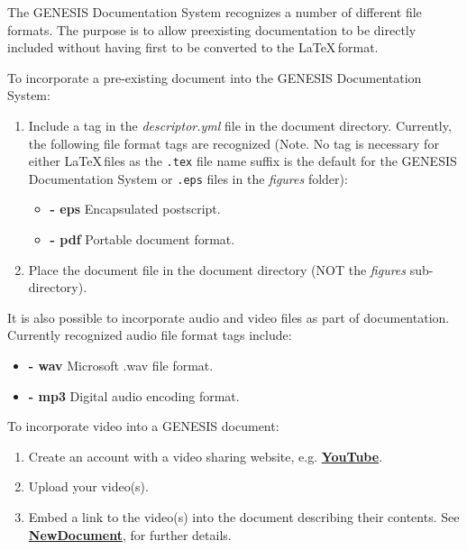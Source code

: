 \documentclass[12pt]{article}
\begin{document}
The GENESIS Documentation System recognizes a number of different file formats. The purpose is to allow preexisting documentation to be directly included without having first to be converted to the \LaTeX\,format.

To incorporate a pre-existing document into the GENESIS Documentation System:

\begin{enumerate}

\item Include a tag in the {\it descriptor.yml} file in the document directory. Currently, the following file format tags are recognized (Note. No tag is necessary for either \LaTeX\,files as the {\tt .tex} file name suffix is the default for the GENESIS Documentation System or {\tt .eps} files in the {\it figures} folder):

\begin{itemize}

\item[]{\bf - eps} Encapsulated postscript.
\item[]{\bf - pdf} Portable document format.

\end{itemize}

\item Place the document file in the document directory (NOT the {\it figures} sub-directory).

\end{enumerate}

It is also possible to incorporate audio and video files as part of documentation. Currently recognized audio file format tags include:

\begin{itemize}
   \item[]{\bf - wav} Microsoft .wav file format.
   \item[]{\bf - mp3} Digital audio encoding format.
\end{itemize}

To incorporate video into a GENESIS document: 

\begin{enumerate}
   \item Create an account with a video sharing website, e.g. \href{http://www.youtube.com/watch?v=1n8DxTk2gVM}{\bf YouTube}.
   \item Upload your video(s).
   \item Embed a link to the video(s) into the document describing their contents. See \href{../NewDocument/NewDocument.tex}{\bf NewDocument}, for further details.
\end{enumerate}
\end{document}

